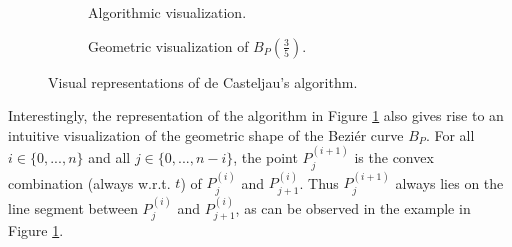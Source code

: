 \documentclass[a4paper, 11pt]{report}
\theoremstyle{definition}
\begin{document}
\begin{figure}[H]
	\centering
	\begin{subfigure}{0.49\textwidth}
		\caption{Algorithmic visualization.}
	\end{subfigure}
	\hfill
	\begin{subfigure}{0.49\textwidth}
		
		\caption{Geometric visualization of $B_P(\frac{3}{5})$.}
	\end{subfigure}
	\caption{Visual representations of de Casteljau's algorithm.}
	\label{fig:decasteljautriangle}
\end{figure}

Interestingly, the representation of the algorithm in Figure \ref{fig:decasteljautriangle} also gives rise to an intuitive visualization of the geometric shape of the Beziér curve $B_P$. For all $i \in \{0, ..., n\}$ and all $j \in \{0, ..., n-i\}$, the point $P^{(i+1)}_j$ is the convex combination (always w.r.t. $t$) of $P^{(i)}_j$ and $P^{(i)}_{j+1}$. Thus $P^{(i+1)}_j$ always lies on the line segment between $P^{(i)}_j$ and $P^{(i)}_{j+1}$, as can be observed in the example in Figure \ref{fig:decasteljautriangle}.
\end{document}
